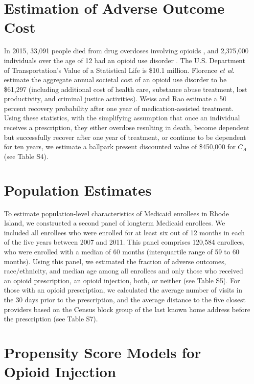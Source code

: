 \documentclass[9pt,twoside]{pnas-new}
\begin{document}
\section{Estimation of Adverse Outcome Cost}

In 2015, 33,091 people died from drug overdoses involving opioids \cite{nida1}, and 2,375,000 individuals over the age of 12 had an opioid use disorder \cite{cbhsq}. The U.S. Department of Transportation's Value of a Statistical Life is \$10.1 million. Florence \textit{et al}. \cite{florence} estimate the aggregate annual societal cost of an opioid use disorder to be \$61,297 (including additional cost of health care, substance abuse treatment, lost productivity, and criminal justice activities). Weiss and Rao \cite{weiss} estimate a 50 percent recovery probability after one year of medication-assisted treatment. Using these statistics, with the simplifying assumption that once an individual receives a prescription, they either overdose resulting in death, become dependent but successfully recover after one year of treatment, or continue to be dependent for ten years, we estimate a ballpark present discounted value of \$450,000 for $C_A$ (see Table S4).

\section{Population Estimates}

To estimate population-level characteristics of Medicaid enrollees in Rhode Island, we constructed a second panel of longterm Medicaid enrollees. We included all enrollees who were enrolled for at least six out of 12 months in each of the five years between 2007 and 2011. This panel comprises 120,584 enrollees, who were enrolled with a median of 60 months (interquartile range of 59 to 60 months). Using this panel, we estimated the fraction of adverse outcomes, race/ethnicity, and median age among all enrollees and only those who received an opioid prescription, an opioid injection, both, or neither (see Table S5). For those with an opioid prescription, we calculated the average number of visits in the 30 days prior to the prescription, and the average distance to the five closest providers based on the Census block group of the last known home address before the prescription (see Table S7).

\section{Propensity Score Models for Opioid Injection}
\end{document}
